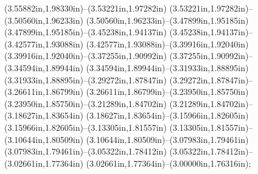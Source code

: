 (3.55882in,1.98330in)--(3.53221in,1.97282in) (3.53221in,1.97282in)--(3.50560in,1.96233in) (3.50560in,1.96233in)--(3.47899in,1.95185in) (3.47899in,1.95185in)--(3.45238in,1.94137in) (3.45238in,1.94137in)--(3.42577in,1.93088in) (3.42577in,1.93088in)--(3.39916in,1.92040in) (3.39916in,1.92040in)--(3.37255in,1.90992in) (3.37255in,1.90992in)--(3.34594in,1.89944in) (3.34594in,1.89944in)--(3.31933in,1.88895in) (3.31933in,1.88895in)--(3.29272in,1.87847in) (3.29272in,1.87847in)--(3.26611in,1.86799in) (3.26611in,1.86799in)--(3.23950in,1.85750in) (3.23950in,1.85750in)--(3.21289in,1.84702in) (3.21289in,1.84702in)--(3.18627in,1.83654in) (3.18627in,1.83654in)--(3.15966in,1.82605in) (3.15966in,1.82605in)--(3.13305in,1.81557in) (3.13305in,1.81557in)--(3.10644in,1.80509in) (3.10644in,1.80509in)--(3.07983in,1.79461in) (3.07983in,1.79461in)--(3.05322in,1.78412in) (3.05322in,1.78412in)--(3.02661in,1.77364in) (3.02661in,1.77364in)--(3.00000in,1.76316in);
